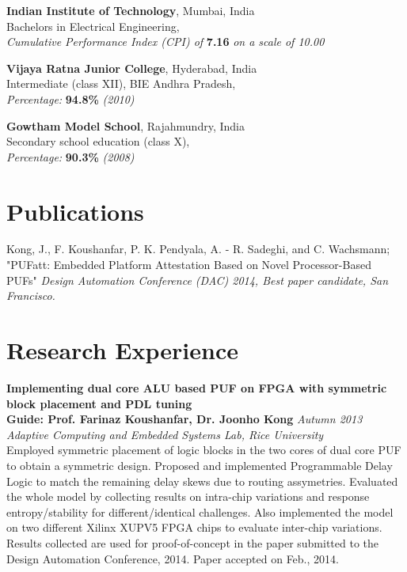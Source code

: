 \documentclass[margin,line]{resume}
\begin{document}
\begin{resume}
		{\bf Indian Institute of Technology}, Mumbai, India\\
		Bachelors in Electrical Engineering,\\
        \textit{\hspace*{2mm}Cumulative Performance Index (CPI) of} \textbf{7.16} \textit{on a scale of 10.00}
        \vspace{-2mm}
        
        {\bf Vijaya Ratna Junior College}, Hyderabad, India\\
		Intermediate (class XII), BIE Andhra Pradesh,\\
        \textit{\hspace*{2mm}Percentage:} \textbf{94.8\%} \textit{(2010)}
        \vspace{-2mm}
        
        {\bf Gowtham Model School}, Rajahmundry, India\\
		Secondary school education (class X),\\
        \textit{\hspace*{2mm}Percentage:} \textbf{90.3\%} \textit{(2008)}
        

\section{\mysidestyle Publications}
	Kong, J., F. Koushanfar, P. K. Pendyala, A. - R. Sadeghi, and C. Wachsmann; "PUFatt: Embedded Platform Attestation Based on Novel Processor-Based PUFs"	\hfill {\textit{Design Automation Conference (DAC) 2014, Best paper candidate, San Francisco.}}\\
	\vspace{-2mm}
	
			
\section{\mysidestyle Research Experience}
	
    {\bf Implementing dual core ALU based PUF on FPGA with symmetric block placement and PDL tuning} \\
    {\bf Guide: Prof. Farinaz Koushanfar, Dr. Joonho Kong} \hfill \textit{Autumn 2013} \\
    {\it Adaptive Computing and Embedded Systems Lab, Rice University} \\
	Employed symmetric placement of logic blocks in the two cores of dual core PUF to obtain a symmetric design. Proposed and implemented Programmable Delay Logic to match the remaining delay skews due to routing assymetries. Evaluated the whole model by collecting results on intra-chip variations and response entropy/stability for different/identical challenges. Also implemented the model on two different Xilinx XUPV5 FPGA chips to evaluate inter-chip variations. Results collected are used for proof-of-concept in the paper submitted to the Design Automation Conference, 2014. Paper accepted on Feb., 2014.
	

\end{resume}
\end{document}
